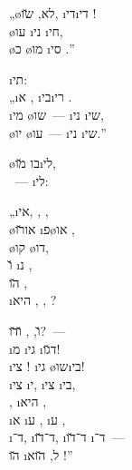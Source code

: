 „\o{לא},   \u{שו}, \i{די}\i{די} !\\
  \o{עו} \i{ני} \i{חי},\\
\o{כ} \o{מו}  \i{סי}  .”

\i{תי}:\\
„\i{א} ,  \i{בי}\i{רי} .\\
\i{מי}  \o{שו}~— \i{ני} \i{שי},\\
\o{יו}  \o{עו}~— \i{ני} \i{שי}.”

 \o{בו}   \u{מו}\i{לי},\\
  ~—   \i{לי}:

„\i{אי}, ,   ,\\
 \o{או}\u{רו} \i{פ}\o{או} ,\\
 \o{קו}   \o{דו},\\
\u{ו} \i{נ}  ,\\
 \u{הו}   ,\\
\i{היא} , , ?

\u{ו}, ,   \u{ו}\u{דו}?~—\\
\i{מ} \i{גי}   \i{ד}\u{גו}!\\
\i{צי} ! \i{גי} \o{שו}\i{בי}!\\
\i{צי}  \i{י}, \i{צי} \i{בי},\\
  , \i{היא} ,\\
\i{א} \i{ע} ,  \i{ע} ,\\
\i{ד}־, \i{ד}־\u{דו}, \i{ד}־\u{דו} \i{ד}־~—\\
\u{הו}  \i{ל}, \u{הוא} !”

